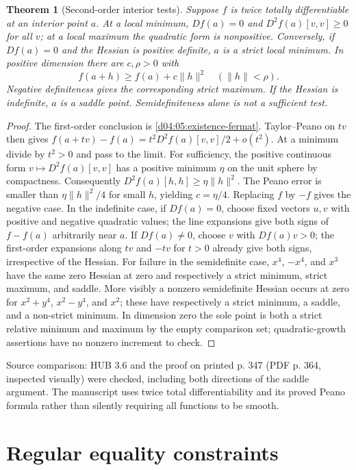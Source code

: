 \documentclass[11pt,oneside,openany]{book}
\newtheorem{theorem}{Theorem}[chapter]
\theoremstyle{definition}
\theoremstyle{remark}
\newcommand{\norm}[1]{\lVert#1\rVert}
\newcommand{\family}[1]{}
\newcommand{\source}[1]{\par\begingroup\small\sffamily\color{black!65}Source comparison: #1\par\endgroup}
\begin{document}
\begin{theorem}[Second-order interior tests]\label{d04:05:second-order}
Suppose $f$ is twice totally differentiable at an interior point $a$.
At a local minimum, $Df(a)=0$ and $D^2f(a)[v,v]\geq0$ for all $v$;
at a local maximum the quadratic form is nonpositive. Conversely, if
$Df(a)=0$ and the Hessian is positive definite, $a$ is a strict local
minimum. In positive dimension there are $c,\rho>0$ with
\[
 f(a+h)\geq f(a)+c\norm{h}^2\quad(\norm{h}<\rho).
\]
Negative definiteness gives the corresponding strict maximum. If the
Hessian is indefinite, $a$ is a saddle point. Semidefiniteness alone is
not a sufficient test.
\end{theorem}
\begin{proof}
The first-order conclusion is \cref{d04:05:existence-fermat}. Taylor--Peano
on $tv$ then gives
$f(a+tv)-f(a)=t^2D^2f(a)[v,v]/2+o(t^2)$.
At a minimum divide by $t^2>0$ and pass to the limit. For sufficiency,
the positive continuous form $v\mapsto D^2f(a)[v,v]$ has a positive
minimum $\eta$ on the unit sphere by compactness. Consequently
$D^2f(a)[h,h]\geq\eta\norm{h}^2$. The Peano error is smaller than
$\eta\norm{h}^2/4$ for small $h$, yielding $c=\eta/4$.
Replacing $f$ by $-f$ gives the negative case. In the indefinite case,
if $Df(a)=0$, choose fixed vectors $u,v$ with positive and negative
quadratic values; the line expansions give both signs of $f-f(a)$
arbitrarily near $a$. If $Df(a)\ne0$, choose $v$ with $Df(a)v>0$;
the first-order expansions along $tv$ and $-tv$ for $t>0$ already give
both signs, irrespective of the Hessian.
For failure in the semidefinite case, $x^4$, $-x^4$, and $x^3$ have the
same zero Hessian at zero and respectively a strict minimum, strict maximum,
and saddle. More visibly a nonzero semidefinite Hessian occurs at zero for
$x^2+y^4$, $x^2-y^4$, and $x^2$; these have respectively a strict minimum,
a saddle, and a non-strict minimum. In dimension zero the sole point is
both a strict relative minimum and maximum by the empty comparison set;
quadratic-growth assertions have no nonzero increment to check.
\end{proof}
\source{HUB 3.6 and the proof on printed p. 347 (PDF p. 364, inspected
visually) were checked, including both directions of the saddle argument.
The manuscript uses twice total differentiability and its proved Peano
formula rather than silently requiring all functions to be smooth.}

\section{Regular equality constraints}
\family{K04.05.07}\family{K04.05.08}
\end{document}
